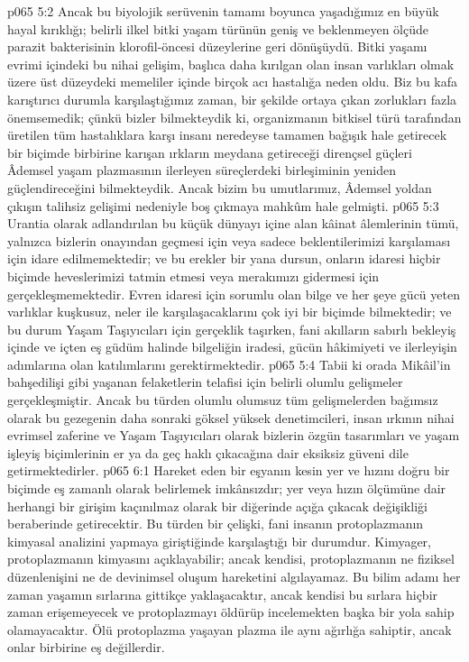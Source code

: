 \vs p065 5:2 Ancak bu biyolojik serüvenin tamamı boyunca yaşadığımız en büyük hayal kırıklığı; belirli ilkel bitki yaşam türünün geniş ve beklenmeyen ölçüde parazit bakterisinin klorofil\hyp{}öncesi düzeylerine geri dönüşüydü. Bitki yaşamı evrimi içindeki bu nihai gelişim, başlıca daha kırılgan olan insan varlıkları olmak üzere üst düzeydeki memeliler içinde birçok acı hastalığa neden oldu. Biz bu kafa karıştırıcı durumla karşılaştığımız zaman, bir şekilde ortaya çıkan zorlukları fazla önemsemedik; çünkü bizler bilmekteydik ki, organizmanın bitkisel türü tarafından üretilen tüm hastalıklara karşı insanı neredeyse tamamen bağışık hale getirecek bir biçimde birbirine karışan ırkların meydana getireceği dirençsel güçleri Âdemsel yaşam plazmasının ilerleyen süreçlerdeki birleşiminin yeniden güçlendireceğini bilmekteydik. Ancak bizim bu umutlarımız, Âdemsel yoldan çıkışın talihsiz gelişimi nedeniyle boş çıkmaya mahkûm hale gelmişti.
\vs p065 5:3 Urantia olarak adlandırılan bu küçük dünyayı içine alan kâinat âlemlerinin tümü, yalnızca bizlerin onayından geçmesi için veya sadece beklentilerimizi karşılaması için idare edilmemektedir; ve bu erekler bir yana dursun, onların idaresi hiçbir biçimde heveslerimizi tatmin etmesi veya merakımızı gidermesi için gerçekleşmemektedir. Evren idaresi için sorumlu olan bilge ve her şeye gücü yeten varlıklar kuşkusuz, neler ile karşılaşacaklarını çok iyi bir biçimde bilmektedir; ve bu durum Yaşam Taşıyıcıları için gerçeklik taşırken, fani akılların sabırlı bekleyiş içinde ve içten eş güdüm halinde bilgeliğin iradesi, gücün hâkimiyeti ve ilerleyişin adımlarına olan katılımlarını gerektirmektedir.
\vs p065 5:4 Tabii ki orada Mikâil’in bahşedilişi gibi yaşanan felaketlerin telafisi için belirli olumlu gelişmeler gerçekleşmiştir. Ancak bu türden olumlu olumsuz tüm gelişmelerden bağımsız olarak bu gezegenin daha sonraki göksel yüksek denetimcileri, insan ırkının nihai evrimsel zaferine ve Yaşam Taşıyıcıları olarak bizlerin özgün tasarımları ve yaşam işleyiş biçimlerinin er ya da geç haklı çıkacağına dair eksiksiz güveni dile getirmektedirler.
\vs p065 6:1 Hareket eden bir eşyanın kesin yer ve hızını doğru bir biçimde eş zamanlı olarak belirlemek imkânsızdır; yer veya hızın ölçümüne dair herhangi bir girişim kaçınılmaz olarak bir diğerinde açığa çıkacak değişikliği beraberinde getirecektir. Bu türden bir çelişki, fani insanın protoplazmanın kimyasal analizini yapmaya giriştiğinde karşılaştığı bir durumdur. Kimyager,  protoplazmanın kimyasını açıklayabilir; ancak kendisi,  protoplazmanın ne fiziksel düzenlenişini ne de devinimsel oluşum hareketini algılayamaz. Bu bilim adamı her zaman yaşamın sırlarına gittikçe yaklaşacaktır, ancak kendisi bu sırlara hiçbir zaman erişemeyecek ve protoplazmayı öldürüp incelemekten başka bir yola sahip olamayacaktır. Ölü protoplazma yaşayan plazma ile aynı ağırlığa sahiptir, ancak onlar birbirine eş değillerdir.
